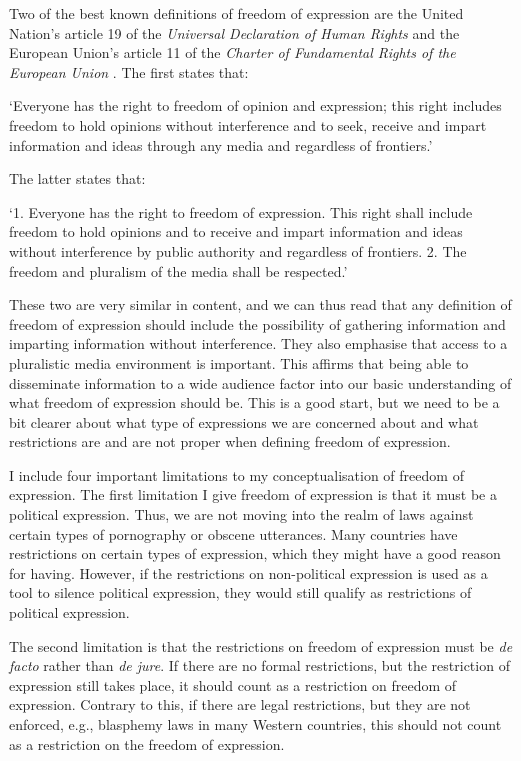 Two of the best known definitions of freedom of expression are the United Nation's article 19 of the \textit{Universal Declaration of Human Rights} \citeyearpar{un_general_assembly_universal_1948} and the European Union's article 11 of the \textit{Charter of Fundamental Rights of the European Union} \citeyearpar{european_parliament_charter_2012}. The first states that:
\begin{displayquote}
`Everyone has the right to freedom of opinion and expression; this right includes freedom to hold opinions without interference and to seek, receive and impart information and ideas through any media and regardless of frontiers.' \citep{un_general_assembly_universal_1948}
\end{displayquote}
The latter states that:
\begin{displayquote}
`1. Everyone has the right to freedom of expression. This right shall include freedom to hold opinions and to receive and impart information and ideas without interference by public authority and regardless of frontiers.
2. The freedom and pluralism of the media shall be respected.' \citep{european_parliament_charter_2012}
\end{displayquote}
These two are very similar in content, and we can thus read that any definition of freedom of expression should include the possibility of gathering information and imparting information without interference. They also emphasise that access to a pluralistic media environment is important. This affirms that being able to disseminate information to a wide audience factor into our basic understanding of what freedom of expression should be. This is a good start, but we need to be a bit clearer about what type of expressions we are concerned about and what restrictions are and are not proper when defining freedom of expression. 

I include four important limitations to my conceptualisation of freedom of expression. The first limitation I give freedom of expression is that it must be a political expression. Thus, we are not moving into the realm of laws against certain types of pornography \citep[pp. 6-7]{bonotti_freedom_2021} or obscene utterances. Many countries have restrictions on certain types of expression, which they might have a good reason for having. However, if the restrictions on non-political expression is used as a tool to silence political expression, they would still qualify as restrictions of political expression.

The second limitation is that the restrictions on freedom of expression must be \textit{de facto} rather than \textit{de jure}. If there are no formal restrictions, but the restriction of expression still takes place, it should count as a restriction on freedom of expression. Contrary to this, if there are legal restrictions, but they are not enforced, e.g., blasphemy laws in many Western countries, this should not count as a restriction on the freedom of expression. 

